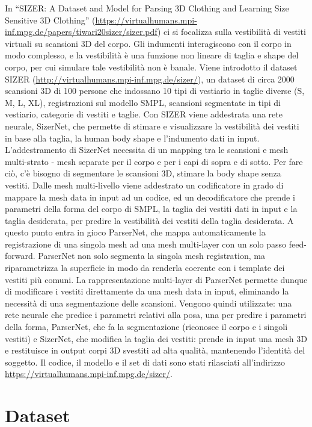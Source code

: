 In “SIZER: A Dataset and Model for Parsing 3D Clothing and Learning Size Sensitive 3D Clothing” (\url{https://virtualhumans.mpi-inf.mpg.de/papers/tiwari20sizer/sizer.pdf}) ci si focalizza sulla vestibilità di vestiti virtuali su scansioni 3D del corpo. Gli indumenti interagiscono con il corpo in modo complesso, e la vestibilità è una funzione non lineare di taglia e shape del corpo, per cui simulare tale vestibilità non è banale. Viene introdotto il dataset SIZER (\url{http://virtualhumans.mpi-inf.mpg.de/sizer/}), un dataset di circa 2000 scansioni 3D di 100 persone che indossano 10 tipi di vestiario in taglie diverse (S, M, L, XL), registrazioni sul modello SMPL, scansioni segmentate in tipi di vestiario, categorie di vestiti e taglie.
Con SIZER viene addestrata una rete neurale, SizerNet, che permette di stimare e visualizzare la vestibilità dei vestiti in base alla taglia, la human body shape e l’indumento dati in input. L’addestramento di SizerNet necessita di un mapping tra le scansioni e mesh multi-strato - mesh separate per il corpo e per i capi di sopra e di sotto. Per fare ciò, c’è bisogno di segmentare le scansioni 3D, stimare la body shape senza vestiti.
Dalle mesh multi-livello viene addestrato un codificatore in grado di mappare la mesh data in input ad un codice, ed un decodificatore che prende i parametri della forma del corpo di SMPL, la taglia dei vestiti dati in input e la taglia desiderata, per predire la vestibilità dei vestiti della taglia desiderata. A questo punto entra in gioco ParserNet, che mappa automaticamente la registrazione di una singola mesh ad una mesh multi-layer con un solo passo feed-forward. ParserNet non solo segmenta la singola mesh registration, ma riparametrizza la superficie in modo da renderla coerente con i template dei vestiti più comuni.
La rappresentazione multi-layer di ParserNet permette dunque di modificare i vestiti direttamente da una mesh data in input, eliminando la necessità di una segmentazione delle scansioni.
Vengono quindi utilizzate: una rete neurale che predice i parametri relativi alla posa, una per predire i parametri della forma, ParserNet, che fa la segmentazione (riconosce il corpo e i singoli vestiti) e SizerNet, che modifica la taglia dei vestiti: prende in input una mesh 3D e restituisce in output corpi 3D svestiti ad alta qualità, mantenendo l’identità del soggetto.
Il codice, il modello e il set di dati sono stati rilasciati all’indirizzo \url{https://virtualhumans.mpi-inf.mpg.de/sizer/}.

\newpage

\section{Dataset}


